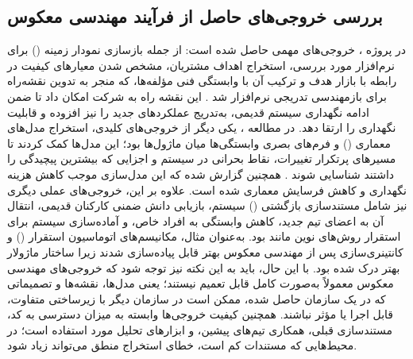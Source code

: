 \subsection*{بررسی خروجی‌های حاصل از فرآیند مهندسی معکوس}
در پروژه ، خروجی‌های مهمی حاصل شده است: از جمله بازسازی نمودار زمینه () برای نرم‌افزار مورد بررسی، استخراج اهداف مشتریان، مشخص شدن معیارهای کیفیت در رابطه با بازار هدف و ترکیب آن با وابستگی فنی مؤلفه‌ها، که منجر به تدوین نقشه‌راه برای بازمهندسی تدریجی نرم‌افزار شد \cite{moraga2018}. 
این نقشه راه به شرکت امکان داد تا ضمن ادامه نگهداری سیستم قدیمی، به‌تدریج عملکردهای جدید را نیز افزوده و قابلیت نگهداری را ارتقا دهد.
در مطالعه ، یکی دیگر از خروجی‌های کلیدی، استخراج مدل‌های معماری () و فرم‌های بصری وابستگی‌ها میان ماژول‌ها بود؛ این مدل‌ها کمک کردند تا مسیرهای پرتکرار تغییرات، نقاط بحرانی در سیستم و اجزایی که بیشترین پیچیدگی را داشتند شناسایی شوند \cite{pascal2019}. 
همچنین گزارش شده که این مدل‌سازی موجب کاهش هزینه نگهداری و کاهش فرسایش معماری شده است.
علاوه بر این، خروجی‌های عملی دیگری نیز شامل مستندسازی بازگشتی () سیستم، بازیابی دانش ضمنی کارکنان قدیمی، انتقال آن به اعضای تیم جدید، کاهش وابستگی به افراد خاص، و آماده‌سازی سیستم برای استقرار روش‌های نوین مانند  بود. 
به‌عنوان مثال، مکانیسم‌های اتوماسیون استقرار () و کانتینری‌سازی پس از مهندسی معکوس بهتر قابل پیاده‌سازی شدند زیرا ساختار ماژولار بهتر درک شده بود.
با این حال، باید به این نکته نیز توجه شود که خروجی‌های مهندسی معکوس معمولاً به‌صورت کامل قابل تعمیم نیستند؛ یعنی مدل‌ها، نقشه‌ها و تصمیماتی که در یک سازمان حاصل شده، ممکن است در سازمان دیگر با زیرساختی متفاوت، قابل اجرا یا مؤثر نباشند. 
همچنین کیفیت خروجی‌ها وابسته به میزان دسترسی به کد، مستندسازی قبلی، همکاری تیم‌های پیشین، و ابزارهای تحلیل مورد استفاده است؛ در محیط‌هایی که مستندات کم است، خطای استخراج منطق می‌تواند زیاد شود.
